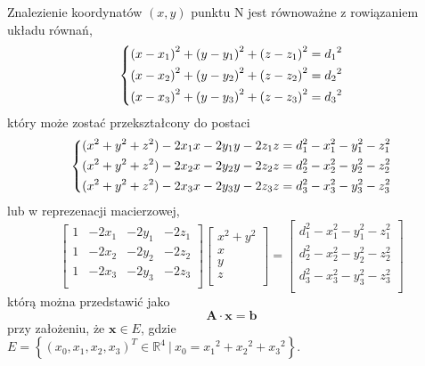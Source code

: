 Znalezienie koordynatów $(x,y)$ punktu N jest równoważne z rowiązaniem układu równań,
\begin{equation}
    \begin{dcases}
        {(x - x_1)}^2 + {(y - y_1)}^2 + {(z - z_1)}^2 = {d_1}^2\\
        {(x - x_2)}^2 + {(y - y_2)}^2 + {(z - z_2)}^2 = {d_2}^2\\
        {(x - x_3)}^2 + {(y - y_3)}^2 + {(z - z_3)}^2 = {d_3}^2\\
    \end{dcases}
\end{equation}
który może zostać przekształcony do postaci
\begin{equation}
    \begin{dcases}
        (x^2 + y^2 + z^2) - 2x_1x - 2y_1y - 2z_1z = d_1^2 - x_1^2 - y_1^2 - z_1^2\\
        (x^2 + y^2 + z^2) - 2x_2x - 2y_2y - 2z_2z = d_2^2 - x_2^2 - y_2^2 - z_2^2\\
        (x^2 + y^2 + z^2) - 2x_3x - 2y_3y - 2z_3z = d_3^2 - x_3^2 - y_3^2 - z_3^2\\
    \end{dcases}
\end{equation}
lub w reprezenacji macierzowej,
\begin{equation}
    \left[
        \begin{matrix}
            1 & -2x_1 & -2y_1 & -2z_1\\
            1 & -2x_2 & -2y_2 & -2z_2\\
            1 & -2x_3 & -2y_3 & -2z_3\\
        \end{matrix}
    \right]
    \left[
        \begin{matrix}
            x^2 + y^2\\
            x\\
            y\\
            z\\
        \end{matrix}
    \right]
    =
    \left[
        \begin{matrix}
            d_1^2 - x_1^2 - y_1^2 - z_1^2\\
            d_2^2 - x_2^2 - y_2^2 - z_2^2\\
            d_3^2 - x_3^2 - y_3^2 - z_3^2\\
        \end{matrix}
    \right]
\end{equation}
którą można przedstawić jako
\begin{equation}
    \mathbf{A} \cdot \mathbf{x} = \mathbf{b}
\label{eq:matrix}
\end{equation}
przy założeniu, że $\mathbf{x} \in E$, gdzie $E = \left\{(x_0, x_1, x_2, x_3)^T \in {\mathbb{R}}^4\ |\ x_0 = {x_1}^2 + {x_2}^2 + {x_3}^2\right\}$.

